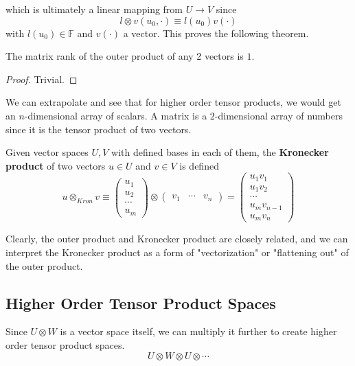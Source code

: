   which is ultimately a linear mapping from $U \longrightarrow V$ since
  \[l \otimes v (u_0, \cdot) \equiv l(u_0) v(\cdot)\]
  with $l(u_0) \in \mathbb{F}$ and $v(\cdot)$ a vector. This proves the following theorem. 

  \begin{theorem}
    The matrix rank of the outer product of any 2 vectors is $1$. 
  \end{theorem}
  \begin{proof}
    Trivial.
  \end{proof}

  We can extrapolate and see that for higher order tensor products, we would get an $n$-dimensional array of scalars. A matrix is a $2$-dimensional array of numbers since it is the tensor product of two vectors. 

  \begin{definition}
    Given vector spaces $U, V$ with defined bases in each of them, the \textbf{Kronecker product} of two vectors $u \in U$ and $v \in V$ is defined
    \[u \otimes_{Kron} v \equiv \begin{pmatrix}
    u_1 \\ u_2 \\ \cdots \\ u_m
    \end{pmatrix} \otimes \begin{pmatrix}
    v_1 & \cdots & v_n
    \end{pmatrix} = \begin{pmatrix}
    u_1 v_1 \\ u_1 v_2 \\ \cdots \\ u_m v_{n-1} \\ u_m v_n 
    \end{pmatrix}\]
  \end{definition}

  Clearly, the outer product and Kronecker product are closely related, and we can interpret the Kronecker product as a form of "vectorization" or "flattening out" of the outer product. 

\subsection{Higher Order Tensor Product Spaces}

  Since $U \otimes W$ is a vector space itself, we can multiply it further to create higher order tensor product spaces. 
  \[U \otimes W \otimes U \otimes \cdots\]

